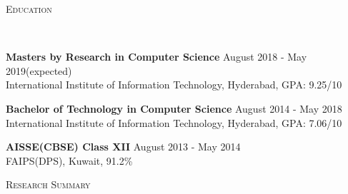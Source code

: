 \documentclass[10pt]{article}
\newenvironment{changemargin}[2]{%
    \begin{list}{}{%
            \setlength{\topsep}{0pt}%
            \setlength{\leftmargin}{#1}%
            \setlength{\rightmargin}{#2}%
            \setlength{\listparindent}{\parindent}%
        \setlength{\itemindent}{\parindent}%
            \setlength{\parsep}{\parskip}%
        }%
\item[]}{\end{list}
}
\newcommand{\lineover}{
    \begin{changemargin}{-0.05in}{-0.10in}
        \vspace*{-8pt}
        \hrulefill \\
        \vspace*{-2pt}
    \end{changemargin}
}
\newcommand{\header}[1]{
    \begin{changemargin}{-0.75in}{-0.75in}
        \scshape{#1}\\
        \lineover
    \end{changemargin}
}
\newenvironment{body} {
    \vspace*{-16pt}
    \begin{changemargin}{-0.6in}{-0.65in}
    }   
    {\end{changemargin}
}
\begin{document}
\header{Education}
\vspace{14pt}
\begin{body}
    {\bf Masters by Research in Computer Science} \hfill {August 2018 - May 2019(expected)} 
    \\ International Institute of Information Technology, Hyderabad,
    GPA: 9.25/10
\end{body}
\vspace{16pt}
\begin{body}
{\bf Bachelor of Technology in Computer Science} \hfill {August 2014 - May 2018} 
    \\ International Institute of Information Technology, Hyderabad, GPA: 7.06/10
\end{body}
\vspace{16pt}
\begin{body}
    {\bf AISSE(CBSE) Class XII} \hfill {August 2013 - May 2014} 
    \\ FAIPS(DPS), Kuwait, 91.2\%
\end{body}
\smallskip
\header{Research Summary}
\end{document}
